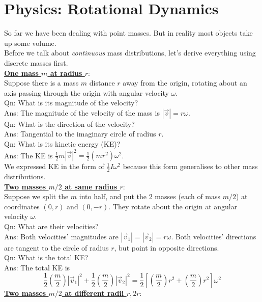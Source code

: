 \documentclass{article}
\begin{document}
\section{Physics: Rotational Dynamics}
So far we have been dealing with point masses. But in reality most objects take up some volume. \\[10pt]
Before we talk about \textit{continuous} mass distributions, let's derive everything using discrete masses first. \\[10pt]
\underline{\textbf{One mass $m$ at radius $r$}}: \\[2pt]
Suppose there is a mass $m$ distance $r$ away from the origin, rotating about an axis passing through the origin with angular velocity $\omega$. \\[10pt]
Qn: What is its magnitude of the velocity? \\[0pt]
Ans: The magnitude of the velocity of the mass is $|\vec{v}| = r\omega$. \\[10pt]
Qn: What is the direction of the velocity? \\[0pt]
Ans: Tangential to the imaginary circle of radius $r$. \\[10pt]
Qn: What is its kinetic energy (KE)? \\[0pt]
Ans: The KE is $\frac{1}{2} m |\vec{v}|^2 = \frac{1}{2} (mr^2) \omega^2$.\\[10pt]
We expressed KE in the form of $\frac{1}{2} I \omega^2$ because this form generalises to other mass distributions. \\[10pt]
\underline{\textbf{Two masses $m/2$ at same radius $r$}}: \\[2pt] Suppose we split the $m$ into half, and put the 2 masses (each of mass $m/2$) at coordinates $(0,r)$ and $(0,-r)$. They rotate about the origin at angular velocity $\omega$. \\[10pt]
Qn: What are their velocities? \\[0pt]
Ans: Both velocities' magnitudes are $|\vec{v}_1| = |\vec{v}_2| = r\omega$. Both velocities' directions are tangent to the circle of radius $r$, but point in opposite directions. \\[10pt]
Qn: What is the total KE? \\[0pt]
Ans: The total KE is $$\frac{1}{2} \left(\frac{m}{2}\right) |\vec{v}_1|^2 + \frac{1}{2} \left(\frac{m}{2}\right) |\vec{v}_2|^2 = \frac{1}{2} \left[ \left(\frac{m}{2} \right) r^2 + \left( \frac{m}{2}\right) r^2 \right] \omega^2 $$
\underline{\textbf{Two masses $m/2$ at different radii $r,2r$}}: \\[2pt]
\end{document}
